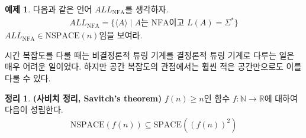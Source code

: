 \documentclass[a4paper, 11pt]{article}
\theoremstyle{definition}
\newtheorem{thm}[defn]{정리}
\newtheorem{ex}[defn]{예제}
\begin{document}
\begin{ex}
    다음과 같은 언어 $ALL_\text{NFA}$를 생각하자.
    \begin{align*}
        ALL_{\text{NFA}} = \{ \langle A \rangle \;\vert\; A \text{는 NFA이고 } L(A) = \Sigma^*\}
    \end{align*}
    $\overline{ALL_{\text{NFA}}} \in \text{NSPACE}(n)$임을 보여라.
\end{ex}
시간 복잡도를 다룰 때는 비결정론적 튜링 기계를 결정론적 튜링 기계로 다루는 일은 매우 어려운 일이었다. 하지만 공간 복잡도의 관점에서는 훨씬 적은 공간만으로도 이를 다룰 수 있다.
\begin{thm}\label{savitch thm}
    \textbf{(사비치 정리, Savitch's theorem)}
    $f(n) \ge n$인 함수 $f: \mathbb{N} \rightarrow \mathbb{R}$에 대하여 다음이 성립한다.
    \begin{align*}
        \text{NSPACE}(f(n)) \subseteq \text{SPACE}((f(n))^2)
    \end{align*}
\end{thm}
\end{document}
